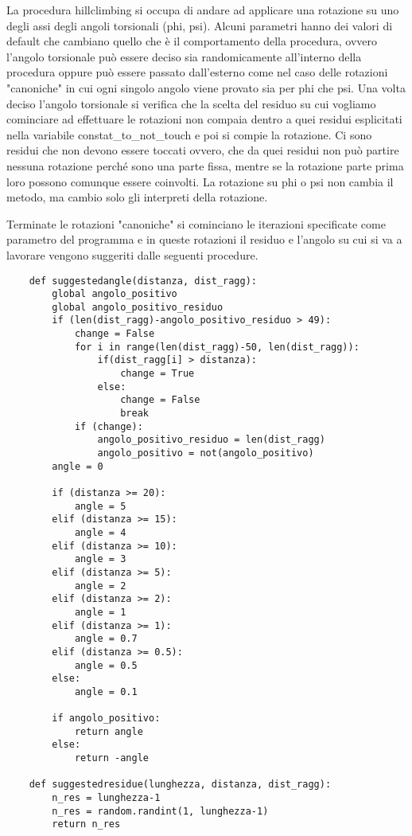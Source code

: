La procedura hillclimbing si occupa di andare ad applicare una rotazione su uno degli assi degli angoli torsionali (phi, psi). Alcuni parametri hanno dei valori di 
default che cambiano quello che è il comportamento della procedura, ovvero l'angolo torsionale può essere deciso sia randomicamente all'interno della procedura oppure
può essere passato dall'esterno come nel caso delle rotazioni "canoniche" in cui ogni singolo angolo viene provato sia per phi che psi. Una volta deciso l'angolo 
torsionale si verifica che la scelta del residuo su cui vogliamo cominciare ad effettuare le rotazioni non compaia dentro a quei residui esplicitati nella variabile
constat\_to\_not\_touch e poi si compie la rotazione. Ci sono residui che non devono essere toccati ovvero, che da quei residui non può partire nessuna rotazione 
perché sono una parte fissa, mentre se la rotazione parte prima loro possono comunque essere coinvolti. La rotazione su phi o psi non cambia il metodo, ma cambio solo 
gli interpreti della rotazione. 

Terminate le rotazioni "canoniche" si cominciano le iterazioni specificate come parametro del programma e in queste rotazioni il residuo e l'angolo su cui si va a
lavorare vengono suggeriti dalle seguenti procedure.
\begin{verbatim}
    def suggestedangle(distanza, dist_ragg):
        global angolo_positivo
        global angolo_positivo_residuo
        if (len(dist_ragg)-angolo_positivo_residuo > 49):
            change = False
            for i in range(len(dist_ragg)-50, len(dist_ragg)):
                if(dist_ragg[i] > distanza):
                    change = True
                else:
                    change = False
                    break
            if (change):
                angolo_positivo_residuo = len(dist_ragg)
                angolo_positivo = not(angolo_positivo)
        angle = 0

        if (distanza >= 20):
            angle = 5
        elif (distanza >= 15):
            angle = 4
        elif (distanza >= 10):
            angle = 3
        elif (distanza >= 5):
            angle = 2
        elif (distanza >= 2):
            angle = 1
        elif (distanza >= 1):
            angle = 0.7
        elif (distanza >= 0.5):
            angle = 0.5
        else:
            angle = 0.1

        if angolo_positivo:
            return angle
        else:
            return -angle

    def suggestedresidue(lunghezza, distanza, dist_ragg):
        n_res = lunghezza-1
        n_res = random.randint(1, lunghezza-1)
        return n_res
\end{verbatim}

